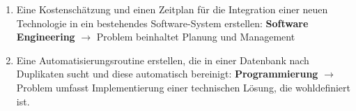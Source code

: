 \begin{enumerate}
\item Eine Kostenschätzung und einen Zeitplan für die Integration einer
neuen Technologie in ein bestehendes Software-System
erstellen:
\newline \textbf{Software Engineering} $\rightarrow$ Problem beinhaltet Planung und Management

\item Eine Automatisierungsroutine erstellen, die in einer Datenbank
nach Duplikaten sucht und diese automatisch bereinigt:
\newline \textbf{Programmierung} $\rightarrow$ Problem umfasst Implementierung einer technischen Lösung, die wohldefiniert ist.

\end{enumerate}